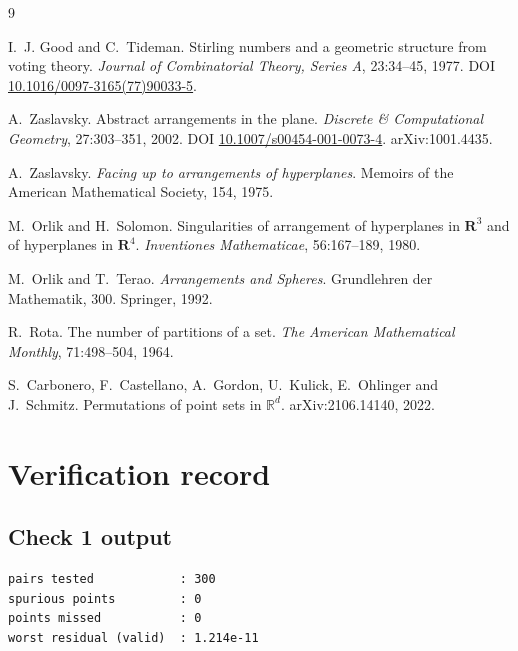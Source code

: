 ﻿\documentclass[11pt,a4paper]{article}
\theoremstyle{definition}
\theoremstyle{remark}
\begin{document}
\begin{thebibliography}{9}

I.~J. Good and C.~Tideman.
\newblock Stirling numbers and a geometric structure from voting theory.
\newblock \emph{Journal of Combinatorial Theory, Series A}, 23:34--45, 1977.
\newblock DOI \href{https://doi.org/10.1016/0097-3165(77)90033-5}
{10.1016/0097-3165(77)90033-5}.

A.~Zaslavsky.
\newblock Abstract arrangements in the plane.
\newblock \emph{Discrete \& Computational Geometry}, 27:303--351, 2002.
\newblock DOI \href{https://doi.org/10.1007/s00454-001-0073-4}
{10.1007/s00454-001-0073-4}.
\newblock arXiv:1001.4435.

A.~Zaslavsky.
\newblock \emph{Facing up to arrangements of hyperplanes}.
\newblock Memoirs of the American Mathematical Society, 154, 1975.

M.~Orlik and H.~Solomon.
\newblock Singularities of arrangement of hyperplanes in $\mathbf{R}^3$ and of
  hyperplanes in $\mathbf{R}^4$.
\newblock \emph{Inventiones Mathematicae}, 56:167--189, 1980.

M.~Orlik and T.~Terao.
\newblock \emph{Arrangements and Spheres}.
\newblock Grundlehren der Mathematik, 300.  Springer, 1992.

R.~Rota.
\newblock The number of partitions of a set.
\newblock \emph{The American Mathematical Monthly}, 71:498--504, 1964.

S.~Carbonero, F.~Castellano, A.~Gordon, U.~Kulick, E.~Ohlinger and
  J.~Schmitz.
\newblock Permutations of point sets in $\mathbb{R}^d$.
\newblock arXiv:2106.14140, 2022.

\end{thebibliography}

\appendix

\section{Verification record}

\subsection{Check 1 output}
\begin{verbatim}
pairs tested            : 300
spurious points         : 0
points missed           : 0
worst residual (valid)  : 1.214e-11
\end{verbatim}
\end{document}
